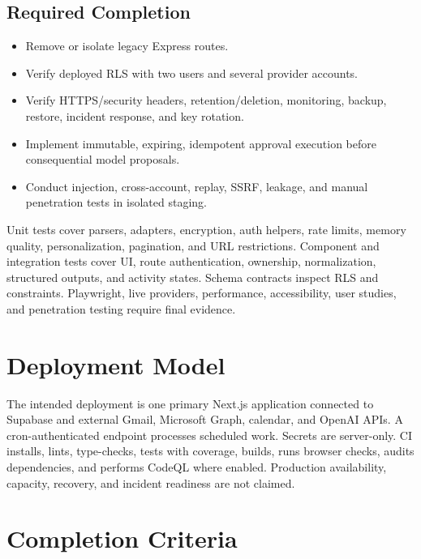 \documentclass[11pt]{article}
\begin{document}
\subsection{Required Completion}
\begin{itemize}
  \item Remove or isolate legacy Express routes.
  \item Verify deployed RLS with two users and several provider accounts.
  \item Verify HTTPS/security headers, retention/deletion, monitoring, backup,
        restore, incident response, and key rotation.
  \item Implement immutable, expiring, idempotent approval execution before
        consequential model proposals.
  \item Conduct injection, cross-account, replay, SSRF, leakage, and manual
        penetration tests in isolated staging.
\end{itemize}

Unit tests cover parsers, adapters, encryption, auth helpers, rate limits,
memory quality, personalization, pagination, and URL restrictions. Component
and integration tests cover UI, route authentication, ownership, normalization,
structured outputs, and activity states. Schema contracts inspect RLS and
constraints. Playwright, live providers, performance, accessibility, user
studies, and penetration testing require final evidence.

\section{Deployment Model}

The intended deployment is one primary Next.js application connected to
Supabase and external Gmail, Microsoft Graph, calendar, and OpenAI APIs. A
cron-authenticated endpoint processes scheduled work. Secrets are server-only.
CI installs, lints, type-checks, tests with coverage, builds, runs browser
checks, audits dependencies, and performs CodeQL where enabled. Production
availability, capacity, recovery, and incident readiness are not claimed.

\section{Completion Criteria}
\end{document}
